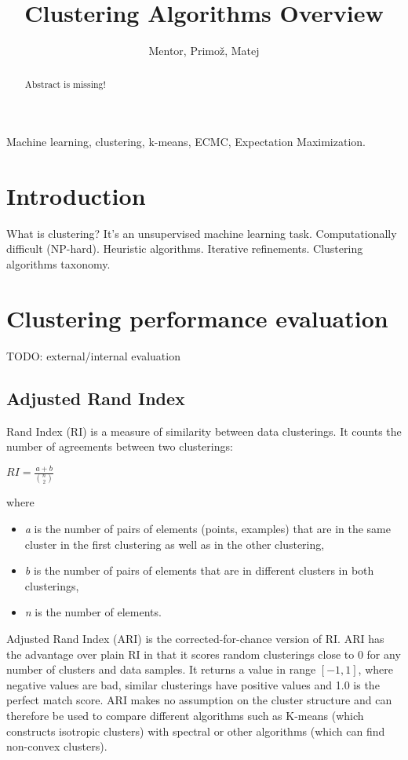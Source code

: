\documentclass[conference]{IEEEtran}
\begin{document}
\title{Clustering Algorithms Overview}
\author{Mentor, Primož, Matej}
\maketitle

\begin{abstract}
Abstract is missing!
\end{abstract}

\begin{IEEEkeywords}
Machine learning, clustering, k-means, ECMC, Expectation Maximization.
\end{IEEEkeywords}

\section{Introduction}
What is clustering? It's an unsupervised machine learning task. Computationally difficult
(NP-hard). Heuristic algorithms. Iterative refinements. Clustering algorithms taxonomy.

\section{Clustering performance evaluation}
TODO: external/internal evaluation

\subsection{Adjusted Rand Index}
Rand Index (RI) is a measure of similarity between data clusterings. It counts
the number of agreements between two clusterings:

$RI = \frac{a+b}{{n \choose 2}}$

where
\begin{itemize}
    \item \textit{a} is the number of pairs of elements (points, examples) that are in the same cluster in the first clustering
    as well as in the other clustering,
    \item \textit{b} is the number of pairs of elements that are in different clusters in both clusterings,
    \item \textit{n} is the number of elements.
\end{itemize}

Adjusted Rand Index (ARI) is the corrected-for-chance version of RI.
ARI has the advantage over plain RI in that it scores random 
clusterings close to 0 for any number of clusters and data samples. It returns
a value in range $[-1, 1]$, where negative values are bad, similar clusterings have
positive values and 1.0 is the perfect match score. ARI makes no assumption on the cluster
structure and can therefore be used to compare different algorithms such as K-means (which
constructs isotropic clusters) with spectral or other algorithms (which can find non-convex
clusters).
\end{document}
